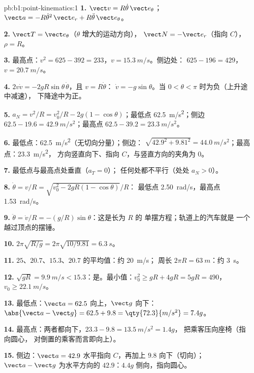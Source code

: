 \begin{solution}{pb:b1:point-kinematics:1}
\textbf{1.} $\vect v = R\dot\theta\,\vect e_\theta$；$\vect a = -R\dot\theta^2
\,\vect e_r + R\ddot\theta\,\vect e_\theta$。

\textbf{2.} $\vect T = \vect e_\theta$（$\theta$ 增大的运动方向），
$\vect N = -\vect e_r$（指向 $C$），$\rho = R$。

\textbf{3.} 最高点：$v^2 = 625 - 392 = 233$，$v = \qty{15.3}{m/s}$。侧边处：
$625 - 196 = 429$，$v = \qty{20.7}{m/s}$。

\textbf{4.} $2v\dot v = -2gR\sin\theta\,\dot\theta$，且 $v = R\dot\theta$：
$\dot v = -g\sin\theta$。当 $0 < \theta < \pi$ 时为负（上升途中减速），
下降途中为正。

\textbf{5.} $a_N = v^2/R = v_0^2/R - 2g(1 - \cos\theta)$；最低点
\qty{62.5}{m/s^2}；侧边 $62.5 - 19.6 = \qty{42.9}{m/s^2}$；最高点 $62.5 -
39.2 = \qty{23.3}{m/s^2}$。

\textbf{6.} 最低点：\qty{62.5}{m/s^2}（无切向分量）；侧边：
$\sqrt{42.9^2 + 9.81^2} = \qty{44.0}{m/s^2}$；最高点：\qty{23.3}{m/s^2}，
方向竖直向下、指向 $C$，与竖直方向的夹角为 $0$。

\textbf{7.} 最低点与最高点处垂直（$a_T = 0$）；
任何处都不平行（处处 $a_N > 0$）。

\textbf{8.} $\dot\theta = v/R = \sqrt{v_0^2 - 2gR(1 - \cos\theta)}/R$：
最低点 \qty{2.50}{rad/s}，最高点 \qty{1.53}{rad/s}。

\textbf{9.} $\ddot\theta = \dot v/R = -(g/R)\sin\theta$：这是长为 $R$ 的
单摆方程；轨道上的汽车就是
一个越过顶点的摆锤。

\textbf{10.} $2\pi\sqrt{R/g} = 2\pi\sqrt{10/9.81} = \qty{6.3}{s}$。

\textbf{11.} $25$、$20.7$、$15.3$、$20.7$ 的平均值：约 \qty{20}{m/s}；
周长 $2\pi R = \qty{63}{m}$：约 \qty{3}{s}。

\textbf{12.} $\sqrt{gR} = \qty{9.9}{m/s} < 15.3$：是。最小值：$v_0^2 \geq
gR + 4gR = 5gR = 490$，$v_0 \geq \qty{22.1}{m/s}$。

\textbf{13.} 最低点：$\vect a = 62.5$ 向上，$\vect g$ 向下：
$\abs{\vect a - \vect g} = 62.5 + 9.8 = \qty{72.3}{m/s^2} = 7.4g$。

\textbf{14.} 最高点：两者都向下，$23.3 - 9.8 = \qty{13.5}{m/s^2} = 1.4g$，
把乘客压向座椅（指向圆心，
对倒置的乘客而言即向上）。

\textbf{15.} 侧边：$\vect a = 42.9$ 水平指向 $C$，再加上 $9.8$
向下（切向）；$\vect a - \vect g$ 为水平方向的 $42.9$：$4.4g$
侧向，指向圆心。


\end{solution}
